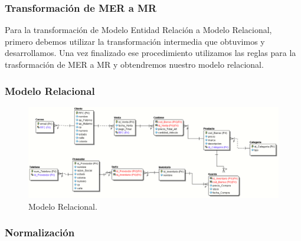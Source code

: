 \documentclass[12pt,letterpaper]{article}
\begin{document}
	\subsubsection{Transformación de MER a MR}
	Para la transformación de Modelo Entidad Relación a Modelo Relacional, primero debemos utilizar la transformación intermedia que obtuvimos y desarrollamos. Una vez finalizado ese procedimiento utilizamos las reglas para la trasformación de MER a MR y obtendremos nuestro modelo relacional.  
	
	\subsubsection{Modelo Relacional}
	\begin{figure}[H]
		\centering
		\includegraphics[width=\linewidth]{img/MR.png}
		\caption{Modelo Relacional.}
	\end{figure}
	
	\subsubsection{Normalización}
	
\end{document}
